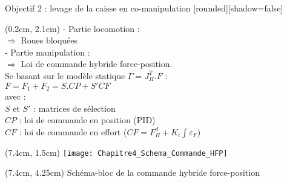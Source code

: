 \documentclass[french]{beamer}
\begin{document}
\begin{frame}{Objectif 2 : levage de la caisse en co-manipulation} %
[rounded][shadow=false]
{\scriptsize
\begin{textblock*}{7cm}(0.2cm, 2.1cm)
- Partie locomotion :\\
\hspace{0.25cm}$\Rightarrow$ Roues bloquées\\
- Partie manipulation :\\
\hspace{0.25cm}$\Rightarrow$ Loi de commande hybride force-position.\\
Se basant sur le modèle statique $\Gamma = J_H^T.F$ :\\
\hspace{2cm}$F = F_1 + F_2 = S.CP + S'CF$\\
avec : \\
$S$ et $S'$ : matrices de sélection\\
$CP$ : loi de commande en position (PID)\\
$CF$ : loi de commande en effort ($CF = F_H^d + K_i\int\varepsilon_F$)\\
\end{textblock*}
}

%
%

\begin{textblock*}{5.4cm}(7.4cm, 1.5cm)
\flushright
\texttt{[image: Chapitre4\_Schema\_Commande\_HFP]}
\end{textblock*}
\begin{textblock*}{5.4cm}(7.4cm, 4.25cm)
\centering
\tiny{Schéma-bloc de la commande hybride force-position}
\end{textblock*}



\end{frame}
\end{document}
